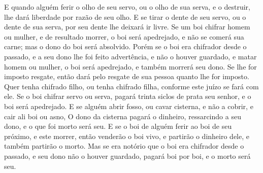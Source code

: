 {E quando alguém ferir o olho de seu servo, ou o olho de sua serva, e o destruir, lhe dará liberdade por razão de seu olho.
E se tirar o dente de seu servo, ou o dente de sua serva, por seu dente lhe deixará ir livre.
Se um boi chifrar homem ou mulher, e de resultado morrer, o boi será apedrejado, e não se comerá sua carne; mas o dono do boi será absolvido.
Porém se o boi era chifrador desde o passado, e a seu dono lhe foi feito advertência, e não o houver guardado, e matar homem ou mulher, o boi será apedrejado, e também morrerá seu dono.
Se lhe for imposto resgate, então dará pelo resgate de sua pessoa quanto lhe for imposto.
Quer tenha chifrado filho, ou tenha chifrado filha, conforme este juízo se fará com ele.
Se o boi chifrar servo ou serva, pagará trinta siclos de prata seu senhor, e o boi será apedrejado.
E se alguém abrir fosso, ou cavar cisterna, e não a cobrir, e cair ali boi ou asno,
O dono da cisterna pagará o dinheiro, ressarcindo a seu dono, e o que foi morto será seu.
E se o boi de alguém ferir ao boi de seu próximo, e este morrer, então venderão o boi vivo, e partirão o dinheiro dele, e também partirão o morto.
Mas se era notório que o boi era chifrador desde o passado, e seu dono não o houver guardado, pagará boi por boi, e o morto será seu.

}
